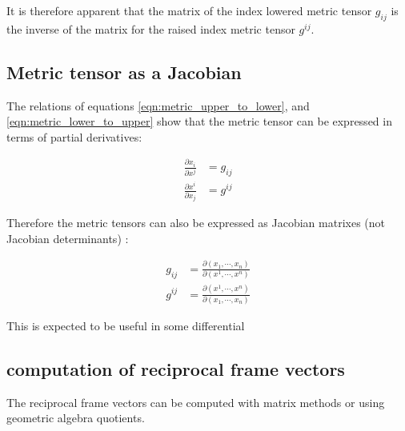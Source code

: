 \documentclass{article}      %
\begin{document}
It is therefore apparent that the matrix of the index lowered metric tensor $g_{ij}$ is the inverse of the matrix for the raised index metric tensor $g^{ij}$.

\subsection{ Metric tensor as a Jacobian }

The relations of equations \ref{eqn:metric_upper_to_lower}, and \ref{eqn:metric_lower_to_upper} show that the metric tensor can be expressed in terms of partial derivatives:

\begin{align}
\frac{\partial x_i }{\partial x^j } &= g_{ij} \\
\frac{\partial x^i }{\partial x_j } &= g^{ij}
\end{align}

Therefore the metric tensors can also be expressed as Jacobian matrixes (not Jacobian determinants) :

\begin{align}
g_{ij} &= \frac{\partial (x_1, \cdots, x_n) }{\partial (x^1, \cdots, x^n) } \\
g^{ij} &= \frac{\partial (x^1, \cdots, x^n) }{\partial (x_1, \cdots, x_n) }
\end{align}

This is expected to be useful in some differential

\subsection{ computation of reciprocal frame vectors }

The reciprocal frame vectors can be computed with matrix methods or using geometric algebra quotients.

\end{document}
